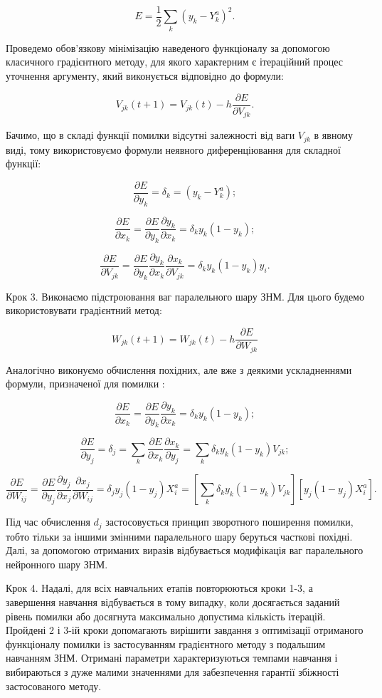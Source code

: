 \[
E=\frac{1}{2}\sum_k{\left(y_k-Y_k^a\right)^2}.
\]

Проведемо обов’язкову мінімізацію наведеного функціоналу за допомогою класичного градієнтного методу, для якого характерним є ітераційний процес уточнення аргументу, який виконується відповідно до формули:

\[
V_{jk}(t+1)=V_{jk}(t)-h\frac{\partial E}{\partial V_{jk}}.
\]

Бачимо, що в складі функції помилки відсутні залежності від ваги $V_{jk}$ в явному виді, тому використовуємо формули неявного диференціювання для складної функції:

\[
\frac{\partial E}{\partial y_k}=\delta_k=\left ( y_k-Y_k^a \right );
\]

\[
\frac{\partial E}{\partial x_k}=\frac{\partial E}{\partial y_k}\frac{\partial y_k}{\partial x_k}=\delta_ky_k(1-y_k);
\]

\[
\frac{\partial E}{\partial V_{jk}}=\frac{\partial E}{\partial y_k}\frac{\partial y_k}{\partial x_k}\frac{\partial x_k}{\partial V_{jk}}=\delta_ky_k(1-y_k)y_i.
\]

Крок 3. Виконаємо підстроювання ваг паралельного шару ЗНМ. Для цього будемо використовувати градієнтний метод:

\[
W_{jk}(t+1)=W_{jk}(t)-h\frac{\partial E}{\partial W_{jk}}
\]

Аналогічно виконуємо обчислення похідних, але вже з деякими ускладненнями формули, призначеної для помилки :

\[
\frac{\partial E}{\partial x_k}=\frac{\partial E}{\partial y_k}\frac{\partial y_k}{\partial x_k}=\delta_ky_k(1-y_k);
\]

\[
\frac{\partial E}{\partial y_j}=\delta_j=\sum_k{\frac{\partial E}{\partial x_k}\frac{\partial x_k}{\partial y_j}}=\sum_k{\delta_ky_k(1-y_k)V_{jk}};
\]

\[
\frac{\partial E}{\partial W_{ij}}
=\frac{\partial E}{\partial y_j}\frac{\partial y_j}{\partial x_j}\frac{\partial x_j}{\partial W_{ij}}
=\delta_jy_j(1-y_j)X_i^a=\left [ \sum_k{\delta_ky_k(1-y_k)V_{jk}} \right ] \left [ y_j\left(1-y_j\right)X_i^a \right ].
\]

Під час обчислення $d_j$ застосовується принцип зворотного поширення помилки, тобто тільки за іншими змінними паралельного шару беруться часткові похідні. Далі, за допомогою отриманих виразів відбувається модифікація ваг паралельного нейронного шару ЗНМ.

Крок 4. Надалі, для всіх навчальних етапів повторюються кроки 1-3, а завершення навчання відбувається в тому випадку, коли досягається заданий рівень помилки або досягнута максимально допустима кількість ітерацій. Пройдені 2 і 3-ій кроки допомагають вирішити завдання з оптимізації отриманого функціоналу помилки із застосуванням градієнтного методу з подальшим навчанням ЗНМ. Отримані параметри характеризуються темпами навчання і вибираються з дуже малими значеннями для забезпечення гарантії збіжності застосованого методу.

